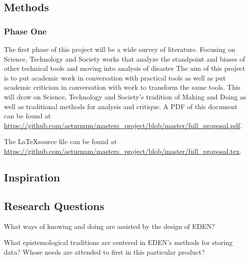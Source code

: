\documentclass[a4paper,man,natbib]{apa6}
\begin{document}
   \subsection*{Methods}
   \subsubsection*{Phase One}
   The first phase of this project will be a wide survey of literature. Focusing on Science, Technology and Society works that analyze the standpoint and biases of other technical tools and moving into analysis of disaster 
   The aim of this project is to put academic work in conversation with practical tools as well as put academic criticism in conversation with work to  transform the same tools. This will draw on Science, Technology and Society's tradition of Making and Doing as well as traditional methods for analysis and critique.
   A PDF of this document can be found at \url{https://github.com/aeturnum/masters_project/blob/master/full_proposal.pdf}.

   The \LaTeX source file can be found at \url{https://github.com/aeturnum/masters_project/blob/master/full_proposal.tex}.
   
   \subsection*{Inspiration}

   \subsection*{Research Questions}
   What ways of knowing and doing are assisted by the design of EDEN?

   What epistemological traditions are centered in EDEN's methods for storing data? Whose needs are attended to first in this particular product?
\end{document}
